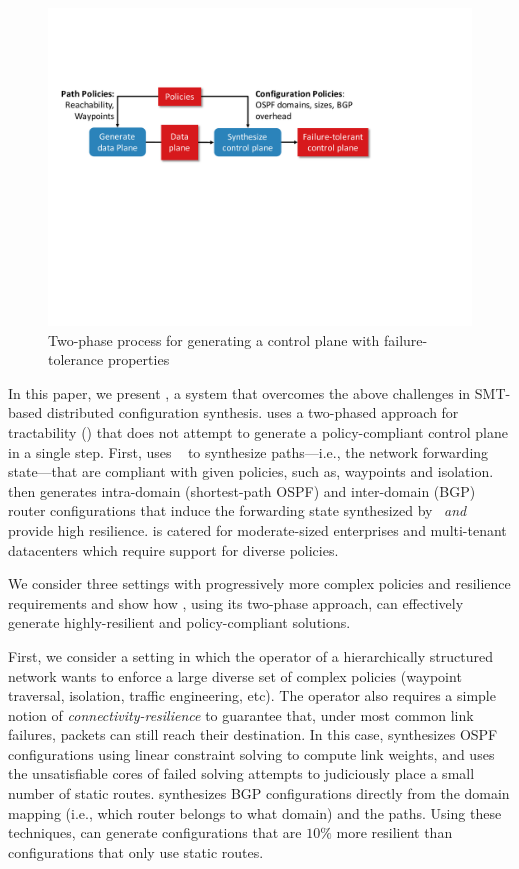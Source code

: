 \begin{figure}
	\includegraphics[width=0.7\columnwidth]{figures/architecture.pdf}
	\caption{Two-phase process for generating a control plane
		with failure-tolerance properties}
	\label{fig:architecture}
\end{figure}

In this paper, we present \name, a system that overcomes the above
challenges in SMT-based distributed configuration synthesis.  \name
uses a two-phased approach for tractability ()
that does not attempt to generate a policy-compliant control plane in
a single step.  First, \name uses \genesis~\cite{genesis} to
synthesize paths---i.e., the network forwarding state---that are
compliant with given policies, such as, waypoints and isolation.
\name then generates intra-domain (shortest-path OSPF) and
inter-domain (BGP) router configurations that induce the forwarding
state synthesized by \genesis\ {\em and} provide high resilience. \name 
is catered for moderate-sized enterprises and multi-tenant datacenters 
which require support for diverse policies.

We consider three settings with progressively more complex policies
and resilience requirements and show how \name, using its two-phase
approach, can effectively generate highly-resilient and
policy-compliant solutions.

First, we consider a setting in which the operator of a hierarchically
structured network wants to enforce a large diverse set of complex
policies (waypoint traversal, isolation, traffic engineering, etc).
The operator also requires a simple notion of
\emph{connectivity-resilience} to guarantee that, under most common
link failures, packets can still reach their destination.  In this
case, \name synthesizes OSPF configurations using linear constraint
solving to compute link weights, and uses the unsatisfiable cores of
failed solving attempts to judiciously place a small number of static
routes.  \name synthesizes BGP configurations directly from the domain
mapping (i.e., which router belongs to what domain) and the paths.
Using these techniques, \name can generate configurations that are
$10\%$ more resilient than configurations that only use static routes.

